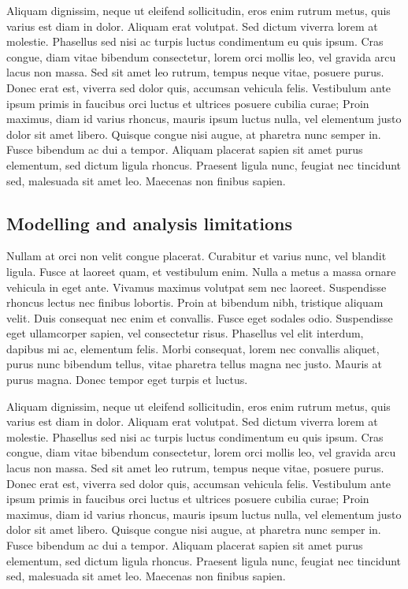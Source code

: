 Aliquam dignissim, neque ut eleifend sollicitudin, eros enim rutrum metus, quis varius est diam in dolor. Aliquam erat volutpat. Sed dictum viverra lorem at molestie. Phasellus sed nisi ac turpis luctus condimentum eu quis ipsum. Cras congue, diam vitae bibendum consectetur, lorem orci mollis leo, vel gravida arcu lacus non massa. Sed sit amet leo rutrum, tempus neque vitae, posuere purus. Donec erat est, viverra sed dolor quis, accumsan vehicula felis. Vestibulum ante ipsum primis in faucibus orci luctus et ultrices posuere cubilia curae; Proin maximus, diam id varius rhoncus, mauris ipsum luctus nulla, vel elementum justo dolor sit amet libero. Quisque congue nisi augue, at pharetra nunc semper in. Fusce bibendum ac dui a tempor. Aliquam placerat sapien sit amet purus elementum, sed dictum ligula rhoncus. Praesent ligula nunc, feugiat nec tincidunt sed, malesuada sit amet leo. Maecenas non finibus sapien.

\subsection{Modelling and analysis limitations}
Nullam at orci non velit congue placerat. Curabitur et varius nunc, vel blandit ligula. Fusce at laoreet quam, et vestibulum enim. Nulla a metus a massa ornare vehicula in eget ante. Vivamus maximus volutpat sem nec laoreet. Suspendisse rhoncus lectus nec finibus lobortis. Proin at bibendum nibh, tristique aliquam velit. Duis consequat nec enim et convallis. Fusce eget sodales odio. Suspendisse eget ullamcorper sapien, vel consectetur risus. Phasellus vel elit interdum, dapibus mi ac, elementum felis. Morbi consequat, lorem nec convallis aliquet, purus nunc bibendum tellus, vitae pharetra tellus magna nec justo. Mauris at purus magna. Donec tempor eget turpis et luctus.

Aliquam dignissim, neque ut eleifend sollicitudin, eros enim rutrum metus, quis varius est diam in dolor. Aliquam erat volutpat. Sed dictum viverra lorem at molestie. Phasellus sed nisi ac turpis luctus condimentum eu quis ipsum. Cras congue, diam vitae bibendum consectetur, lorem orci mollis leo, vel gravida arcu lacus non massa. Sed sit amet leo rutrum, tempus neque vitae, posuere purus. Donec erat est, viverra sed dolor quis, accumsan vehicula felis. Vestibulum ante ipsum primis in faucibus orci luctus et ultrices posuere cubilia curae; Proin maximus, diam id varius rhoncus, mauris ipsum luctus nulla, vel elementum justo dolor sit amet libero. Quisque congue nisi augue, at pharetra nunc semper in. Fusce bibendum ac dui a tempor. Aliquam placerat sapien sit amet purus elementum, sed dictum ligula rhoncus. Praesent ligula nunc, feugiat nec tincidunt sed, malesuada sit amet leo. Maecenas non finibus sapien.


